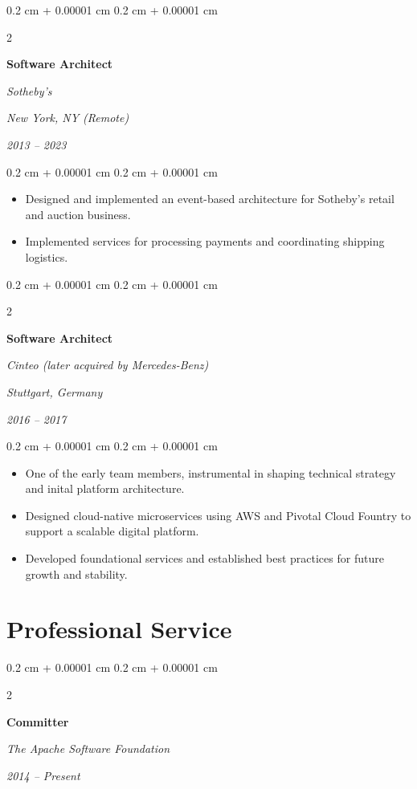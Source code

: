 \documentclass[10pt, letterpaper]{article}
\newenvironment{highlights}{
    \begin{itemize}[
        topsep=0.10 cm,
        parsep=0.10 cm,
        partopsep=0pt,
        itemsep=0pt,
        leftmargin=0.4 cm + 10pt
    ]
}{
    \end{itemize}
} %
\newenvironment{onecolentry}{
    \begin{adjustwidth}{
        0.2 cm + 0.00001 cm
    }{
        0.2 cm + 0.00001 cm
    }
}{
    \end{adjustwidth}
} %
\newenvironment{twocolentry}[2][]{
    \onecolentry
    \def\secondColumn{#2}
    \setcolumnwidth{\fill, 6 cm}
    \begin{paracol}{2}
}{
    \switchcolumn \raggedleft \secondColumn
    \end{paracol}
    \endonecolentry
} %
\begin{document}
\vspace{0.2 cm}

%
%
\begin{twocolentry}{
        \textit{New York, NY (Remote)}

        \textit{2013 – 2023}}
    \textbf{Software Architect}

    \textit{Sotheby's}
\end{twocolentry}

\vspace{0.10 cm}
\begin{onecolentry}
    \begin{highlights}
        \item Designed and implemented an event-based architecture for Sotheby's retail and auction business.
        \item Implemented services for processing payments and coordinating shipping logistics.
    \end{highlights}
\end{onecolentry}

\vspace{0.2 cm}

%
%
\begin{twocolentry}{
        \textit{Stuttgart, Germany}

        \textit{2016 – 2017}}
    \textbf{Software Architect}

    \textit{Cinteo (later acquired by Mercedes-Benz)}
\end{twocolentry}

\vspace{0.10 cm}
\begin{onecolentry}
    \begin{highlights}
        \item One of the early team members, instrumental in shaping technical strategy and inital platform architecture.
        \item Designed cloud-native microservices using AWS and Pivotal Cloud Fountry to support a scalable digital platform.
        \item Developed foundational services and established best practices for future growth and stability.
    \end{highlights}
\end{onecolentry}



\section{Professional Service}
\begin{twocolentry}{
        \textit{2014 – Present}}
    \textbf{Committer}

    \textit{The Apache Software Foundation}
\end{twocolentry}
\end{document}
